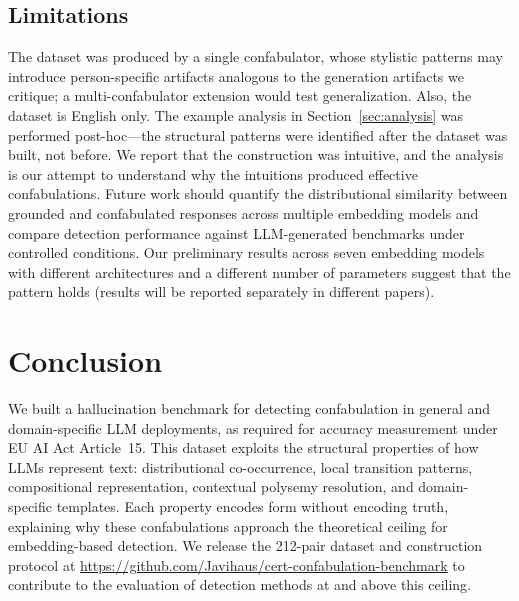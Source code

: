\documentclass[11pt]{article}
\begin{document}
\subsection{Limitations}
The dataset was produced by a single confabulator, whose stylistic patterns may introduce person-specific artifacts analogous to the generation artifacts we critique; a multi-confabulator extension would test generalization. Also, the dataset is English only. The example analysis in Section~\ref{sec:analysis} was performed post-hoc---the structural patterns were identified after the dataset was built, not before.
We report that the construction was intuitive, and the analysis is our attempt to understand why the intuitions produced effective confabulations. Future work should quantify the distributional similarity between grounded and confabulated responses across multiple embedding models and compare detection performance against LLM-generated benchmarks under controlled conditions. Our preliminary results across seven embedding models with different architectures and a different number of parameters suggest that the pattern holds (results will be reported separately in different papers).


\section{Conclusion}

We built a hallucination benchmark for detecting confabulation in general and domain-specific LLM deployments, as required for accuracy measurement under EU AI Act Article~15. This dataset exploits the structural properties of how LLMs represent text: distributional co-occurrence, local transition patterns, compositional representation, contextual polysemy resolution, and domain-specific templates.
Each property encodes form without encoding truth, explaining why these confabulations approach the theoretical ceiling for embedding-based detection. We release the 212-pair dataset and construction protocol at \url{https://github.com/Javihaus/cert-confabulation-benchmark} to contribute to the evaluation of detection methods at and above this ceiling.



\end{document}
